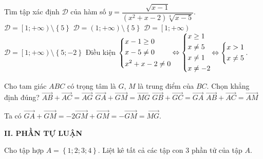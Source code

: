 \begin{ex}%
Tìm tập xác định $\mathscr{D}$ của hàm số $y=\dfrac{\sqrt{x-1}}{(x^2+x-2 )\sqrt[3]{x-5}}$.
\choice
{$\mathscr{D}=\left[ 1;+\infty \right)\setminus \left\{ 5 \right\}$}
{\True $\mathscr{D}=(1;+\infty )\setminus \left\{ 5 \right\}$}  
{ $\mathscr{D}=\left[ 1;+\infty \right)$}
{$\mathscr{D}=\left[ 1;+\infty \right)\setminus \left\{ 5;-2 \right\}$}
\loigiai
{Điều kiện $\left\{\begin{aligned}& x-1\ge 0 \\
		& x-5\ne 0 \\
		& x^2+x-2\ne 0 \\
	\end{aligned}\right.$$\Leftrightarrow \left\{\begin{aligned}& x\ge 1 \\
		& x\ne 5 \\
		& x\ne 1 \\
		& x\ne -2 \\
	\end{aligned}\right.$$\Leftrightarrow \left\{\begin{aligned}& x>1 \\
		& x\ne 5 \\
	\end{aligned}\right.$.}
\end{ex}
\begin{ex}%
Cho tam giác $ABC$ có trọng tâm là $G$, $M$ là trung điểm của $BC$. Chọn khẳng định đúng?
\choice
{$\vec{AB}+\vec{AC}=\vec{AG}$}
{\True $\vec{GA}+\vec{GM}=\vec{MG}$}
{$\vec{GB}+\vec{GC}=\vec{GA}$}
{$\vec{AB}+\vec{AC}=\vec{AM}$}
\loigiai
{
\begin{center}
\end{center}
	Ta có $\vec{GA}+\vec{GM}=-2\vec{GM}+\vec{GM}=-\vec{GM}=\vec{MG}$.}
\end{ex}

\noindent\textbf{II. PHẦN TỰ LUẬN}

\begin{bt}%
	Cho tập hợp $A=\left\{ 1;2;3;4 \right\}$. Liệt kê tất cả các tập con 3 phần tử của tập $A$.
\end{bt}
	
